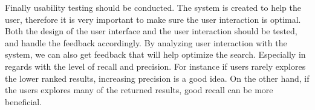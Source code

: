 Finally usability testing should be conducted. The system is created to help the user, therefore it is very important to make sure the user interaction is optimal. Both the design of the user interface and the user interaction should be tested, and handle the feedback accordingly. By analyzing user interaction with the system, we can also get feedback that will help optimize the search. Especially in regards with the level of recall and precision. For instance if users rarely explores the lower ranked results, increasing precision is a good idea. On the other hand, if the users explores many of the returned results, good recall can be more beneficial. 


\cleardoublepage